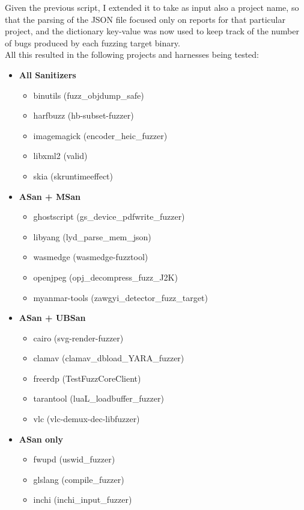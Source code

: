 Given the previous script, I extended it to take as input also a project name, so that the parsing of the JSON file focused only on reports for that particular project, and the dictionary key-value was now used to keep track of the number of bugs produced by each fuzzing target binary.
\ \\ 
 

All this resulted in the following projects and harnesses being tested:
\begin{itemize}
  \item \textbf{All Sanitizers}
  \begin{itemize}
    \item binutils (fuzz\_objdump\_safe)
    \item harfbuzz (hb-subset-fuzzer)
    \item imagemagick (encoder\_heic\_fuzzer)
    \item libxml2 (valid)
    \item skia (skruntimeeffect)
  \end{itemize}
  \item \textbf{ASan + MSan}
  \begin{itemize}
    \item ghostscript (gs\_device\_pdfwrite\_fuzzer)
    \item libyang (lyd\_parse\_mem\_json)
    \item wasmedge (wasmedge-fuzztool)
    \item openjpeg (opj\_decompress\_fuzz\_J2K)
    \item myanmar-tools (zawgyi\_detector\_fuzz\_target)
  \end{itemize}
  \item \textbf{ASan + UBSan}
  \begin{itemize}
    \item cairo (svg-render-fuzzer)
    \item clamav (clamav\_dbload\_YARA\_fuzzer)
    \item freerdp (TestFuzzCoreClient)
    \item tarantool (luaL\_loadbuffer\_fuzzer)
    \item vlc (vlc-demux-dec-libfuzzer)
  \end{itemize}
  \item \textbf{ASan only}
  \begin{itemize}
    \item fwupd (uswid\_fuzzer)
    \item glslang (compile\_fuzzer)
    \item inchi (inchi\_input\_fuzzer)

\end{itemize}
\end{itemize}
